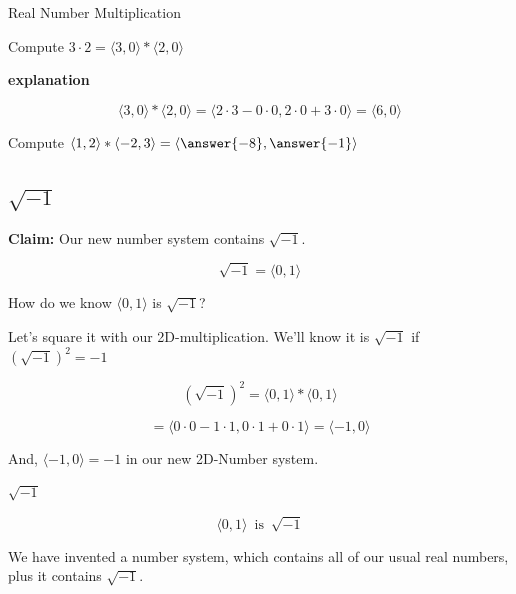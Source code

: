 \documentclass{ximera}
\begin{document}
\begin{example} Real Number Multiplication

Compute  $3 \cdot 2 = \langle 3, 0 \rangle  * \langle 2, 0 \rangle$

\textbf{\textcolor{red!75!green}{explanation}} 


\[
\langle 3, 0 \rangle  * \langle 2, 0 \rangle = \langle 2 \cdot 3 - 0 \cdot 0, 2 \cdot 0 + 3 \cdot 0 \rangle = \langle 6, 0 \rangle 
\]


\end{example}




\begin{question} 


Compute  $\langle 1, 2 \rangle  * \langle -2, 3 \rangle = \left\langle \answer{-8}, \answer{-1} \right\rangle $



\end{question}




\subsection*{$\sqrt{-1}$}

\textbf{Claim:} Our new number system contains $\sqrt{-1}$.


\[  \sqrt{-1} = \langle 0, 1 \rangle  \]


How do we know $\langle 0, 1 \rangle$ is $\sqrt{-1}$?


Let's square it with our 2D-multiplication.  We'll know it is $\sqrt{-1}$ if $(\sqrt{-1})^2 = -1$



\[   (\sqrt{-1})^2 =  \langle 0, 1 \rangle * \langle 0, 1 \rangle  \]

\[ = \langle 0 \cdot 0 - 1 \cdot 1, 0 \cdot 1 + 0 \cdot 1 \rangle  = \langle -1, 0 \rangle\]



And, $\langle -1, 0 \rangle = -1$ in our new 2D-Number system.



\begin{conclusion}  \textbf{\textcolor{green!25!black}{$\sqrt{-1}$}}



\[  \langle 0, 1 \rangle \, \text{ is } \,  \sqrt{-1}  \]


\end{conclusion}


We have invented a number system, which contains all of our usual real numbers, plus it contains $\sqrt{-1}$.
\end{document}

